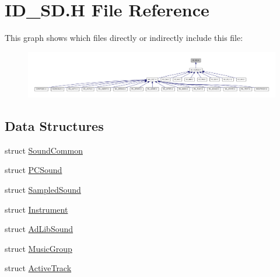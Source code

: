 \hypertarget{ID__SD_8H}{
\section{ID\_\-SD.H File Reference}
\label{ID__SD_8H}
}
This graph shows which files directly or indirectly include this file:
\nopagebreak
\begin{figure}[H]
\begin{center}
\leavevmode
\includegraphics[width=400pt]{ID__SD_8H__dep__incl}
\end{center}
\end{figure}
\subsection*{Data Structures}
\begin{DoxyCompactItemize}
\item 
struct \hyperlink{structSoundCommon}{SoundCommon}
\item 
struct \hyperlink{structPCSound}{PCSound}
\item 
struct \hyperlink{structSampledSound}{SampledSound}
\item 
struct \hyperlink{structInstrument}{Instrument}
\item 
struct \hyperlink{structAdLibSound}{AdLibSound}
\item 
struct \hyperlink{structMusicGroup}{MusicGroup}
\item 
struct \hyperlink{structActiveTrack}{ActiveTrack}
\end{DoxyCompactItemize}
